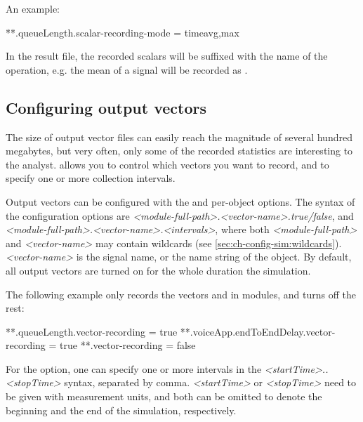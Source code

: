 An example:

\begin{inifile}
**.queueLength.scalar-recording-mode = timeavg,max
\end{inifile}

In the result file, the recorded scalars will be suffixed with the name
of the operation, e.g. the mean of a  signal will
be recorded as .



\subsection{Configuring output vectors}
\label{sec:ch-config-sim:outvectors}

The size of output vector files can easily reach the magnitude of several
hundred megabytes, but very often, only some of the recorded statistics are
interesting to the analyst. {\opp} allows you to control which vectors you
want to record, and to specify one or more collection intervals.

Output vectors can be configured with the  and
 per-object options. The syntax of the
configuration options are
\textit{<module-full-path>.<vector-name>.}\textit{true/false},
and \textit{<module-full-path>.<vector-name>.}\textit{<intervals>},
where both \textit{<module-full-path>} and \textit{<vector-name>} may
contain wildcards (see \ref{sec:ch-config-sim:wildcards}).
\textit{<vector-name>} is the signal name, or the name string of the
 object. By default, all output vectors are turned
on for the whole duration the simulation.

The following example only records the  vectors and
 in  modules, and turns off the rest:

\begin{inifile}
**.queueLength.vector-recording = true
**.voiceApp.endToEndDelay.vector-recording = true
**.vector-recording = false
\end{inifile}

For the  option, one can specify
one or more intervals in the \textit{<startTime>..<stopTime>} syntax,
separated by comma. \textit{<startTime>} or \textit{<stopTime>} need
to be given with measurement units, and both can be omitted to denote
the beginning and the end of the simulation, respectively.

